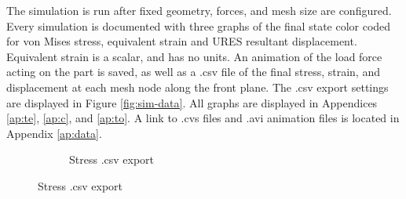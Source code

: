 \documentclass[12pt, letterpaper]{article}
\begin{document}
The simulation is run after fixed geometry, forces, and mesh size are configured. 
Every simulation is documented with three graphs of the final state color coded for von Mises stress, equivalent strain and URES resultant displacement. Equivalent strain is a scalar, and has no units. An animation of the load force acting on the part is saved, as well as a .csv file of the final stress, strain, and displacement at each mesh node along the front plane. The .csv export settings are displayed in Figure \ref{fig:sim-data}. All graphs are displayed in Appendices \ref{ap:te}, \ref{ap:c}, and \ref{ap:to}. A link to .cvs files and .avi animation files is located in Appendix \ref{ap:data}. 

\begin{figure}[H]
	\centering
	\caption{Data Export}
	\label{fig:sim-data}
	\begin{subfigure}[t]{.3\linewidth}
		\caption{Stress .csv export}

\end{subfigure}
\end{figure}
\end{document}
